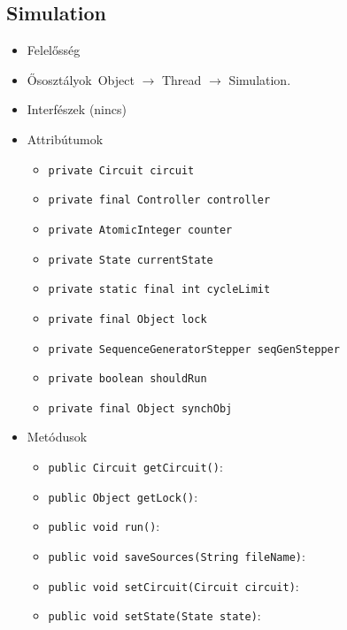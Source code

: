 \subsection{Simulation}
\begin{itemize}
\item Felelősség\\

\item Ősosztályok\ Object $\rightarrow{}$ Thread $\rightarrow{}$ Simulation.
\item Interfészek (nincs)
\item Attribútumok $\ $
\begin{itemize}
	\item \texttt{private Circuit circuit} 
	\item \texttt{private final Controller controller} 
	\item \texttt{private AtomicInteger counter} 
	\item \texttt{private State currentState} 
	\item \texttt{private static final int cycleLimit} 
	\item \texttt{private final Object lock} 
	\item \texttt{private SequenceGeneratorStepper seqGenStepper} 
	\item \texttt{private boolean shouldRun} 
	\item \texttt{private final Object synchObj} 
\end{itemize}
\item Metódusok$\ $
\begin{itemize}
	\item \texttt{public Circuit getCircuit()}: 
	\item \texttt{public Object getLock()}: 
	\item \texttt{public void run()}: 
	\item \texttt{public void saveSources(String fileName)}: 
	\item \texttt{public void setCircuit(Circuit circuit)}: 
	\item \texttt{public void setState(State state)}: 
\end{itemize}
\end{itemize}

